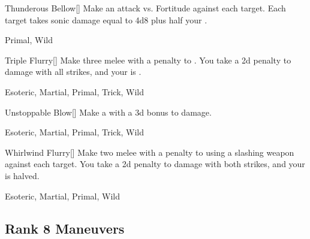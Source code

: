 \lowercase{\hypertarget{maneuver:Thunderous Bellow}{}}\label{maneuver:Thunderous Bellow}
\hypertarget{maneuver:Thunderous Bellow}{}
\begin{freeability}[Rank 7]{Thunderous Bellow}[]
Make an attack vs. Fortitude against each target.
\hit Each target takes sonic damage equal to 4d8 plus half your .


 Primal, Wild
\end{freeability}
\vspace{0.25em}



\lowercase{\hypertarget{maneuver:Triple Flurry}{}}\label{maneuver:Triple Flurry}
\hypertarget{maneuver:Triple Flurry}{}
\begin{freeability}[Rank 7]{Triple Flurry}[]
Make three melee  with a  penalty to .
You take a \minus2d penalty to damage with all strikes, and your  is .


 Esoteric, Martial, Primal, Trick, Wild
\end{freeability}
\vspace{0.25em}



\lowercase{\hypertarget{maneuver:Unstoppable Blow}{}}\label{maneuver:Unstoppable Blow}
\hypertarget{maneuver:Unstoppable Blow}{}
\begin{freeability}[Rank 7]{Unstoppable Blow}[]
Make a  with a \plus3d bonus to damage.


 Esoteric, Martial, Primal, Trick, Wild
\end{freeability}
\vspace{0.25em}



\lowercase{\hypertarget{maneuver:Whirlwind Flurry}{}}\label{maneuver:Whirlwind Flurry}
\hypertarget{maneuver:Whirlwind Flurry}{}
\begin{freeability}[Rank 7]{Whirlwind Flurry}[]
Make two melee  with a  penalty to  using a slashing weapon against each target.
You take a \minus2d penalty to damage with both strikes, and your  is halved.


 Esoteric, Martial, Primal, Wild
\end{freeability}
\vspace{0.25em}


\subsection{Rank 8 Maneuvers}